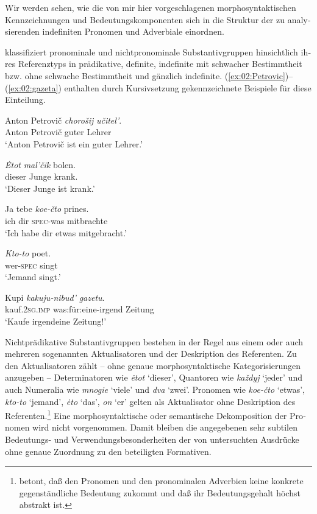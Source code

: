 \documentclass[output=paper, colorlinks, citecolor=brown, booklanguage=german]{langscibook}
\begin{document}
\begin{otherlanguage}{german}
Wir werden sehen, wie die von mir hier vorgeschlagenen morpho\-syntak\-tisch\-en Kennzeichnungen und Bedeutungskomponenten sich in die Struktur der zu analysierenden indefiniten Pronomen und Adverbiale einordnen.

\citet{Paduceva1985} klassifiziert pronominale und nichtpronominale Substantivgruppen hinsichtlich ihres Referenztyps in prädikative, definite, indefinite mit schwacher Bestimmtheit bzw. ohne schwache Bestimmtheit und gänzlich indefinite. (\ref{ex:02:Petrovic})--(\ref{ex:02:gazeta}) enthalten durch Kursivsetzung gekennzeichnete Beispiele für diese Einteilung.

\ea\label{ex:02:Petrovic}
\gll Anton Petrovič \textit{chorošij} \textit{učitel'}.\\
Anton Petrovič  guter Lehrer\\
\glt ‘Anton Petrovič ist ein guter Lehrer.’
\z 

\ea\label{ex:02:malcik}
\gll \textit{\.{E}tot} \textit{mal'čik}  bolen.\\
dieser Junge krank.\\
\glt ‘Dieser Junge ist krank.’
\z 

\ea\label{ex:02:prines}
\gll Ja tebe \textit{koe-čto} prines.\\
ich dir \textsc{spec}-was mitbrachte\\
\glt ‘Ich habe dir etwas mitgebracht.’
\z 

\ea\label{ex:02:poet}
\gll \textit{Kto-to} poet.\\
wer-\textsc{spec} singt \\
\glt ‘Jemand singt.’
\z 

\ea\label{ex:02:gazeta}
\gll Kupi \textit{kakuju-nibud'} \textit{gazetu}.\\
kauf.2\textsc{sg}.\textsc{imp} was:für:eine-irgend Zeitung \\
\glt ‘Kaufe irgendeine Zeitung!’
\z 

\noindent Nichtprädikative Substantivgruppen bestehen in der Regel aus einem oder auch mehreren sogenannten Aktualisatoren und der Deskription des Referenten. Zu den Aktualisatoren zählt \citet{Paduceva1985} -- ohne genaue morphosyntaktische Kategorisierungen anzugeben -- Determinatoren wie \textit{\.{e}tot} `dieser', Quantoren wie \textit{každyj} `jeder' und auch Numeralia wie \textit{mnogie} `viele' und \textit{dva} `zwei'. Pronomen wie \textit{koe-čto} `etwas', \textit{kto-to} `jemand', \textit{\.{e}to} `das', \textit{on} `er' gelten als Aktualisator ohne Deskription des Referenten.\footnote{\citet[154ff.]{Peskovskij1956} betont, daß den Pronomen und den pronominalen Adverbien keine konkrete gegenständliche Bedeutung zukommt und daß ihr Bedeutungsgehalt höchst abstrakt ist.} Eine morphosyntaktische oder se\-man\-ti\-sche Dekomposition der Pronomen wird nicht vorgenommen. Damit bleiben die angegebenen sehr subtilen Bedeutungs- und Verwendungsbesonderheiten der von \citeauthor{Paduceva1985} untersuchten Ausdrücke ohne genaue Zuordnung zu den beteiligten Formativen.


\end{otherlanguage}
\end{document}
